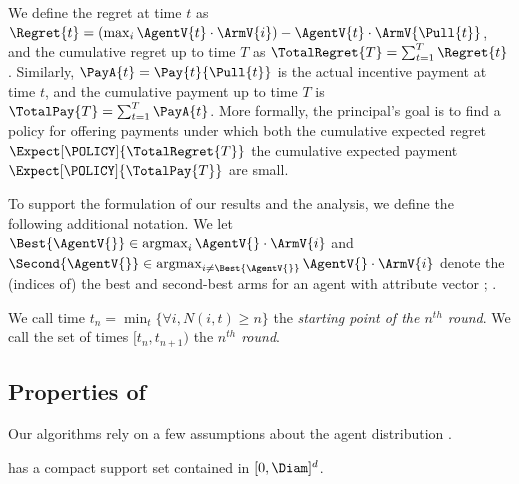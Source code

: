 We define the regret at time $t$ as
$\Regret{t} = (\max_{i} \AgentV{t} \cdot \ArmV{i}) - \AgentV{t} \cdot \ArmV{\Pull{t}}$,
and the cumulative regret up to time $T$ as
$\TotalRegret{T} = \sum_{t=1}^{T} \Regret{t}$.
Similarly, $\PayA{t} = \Pay{t}{\Pull{t}}$ is the actual incentive
payment at time $t$,
and the cumulative payment up to time $T$ is
$\TotalPay{T} = \sum_{t=1}^{T} \PayA{t}$.
More formally, the principal's goal is to find a policy
\POLICY for offering payments under which both the cumulative expected
regret
$\Expect[\POLICY]{\TotalRegret{T}}$ the cumulative expected payment
$\Expect[\POLICY]{\TotalPay{T}}$ are small.

To support the formulation of our results and the analysis,
we define the following additional notation.
We let
$\Best{\AgentV{}} \in \argmax_i \AgentV{} \cdot \ArmV{i}$
and
$ \Second{\AgentV{}} \in \argmax_{i \neq \Best{\AgentV{}}} \AgentV{} \cdot \ArmV{i}$
denote the (indices of) the best and second-best arms for an agent
with attribute vector \AgentV{};
.

We call time $t_{n}=\min_{t}\{\forall i, N(i,t)\geq n\}$ the
\emph{starting point of the $n^{th}$ round}.
We call the set of times $[t_{n}, t_{n+1})$ the
\emph{$n^{th}$ round}.




\subsection{Properties of \AgentDist}
Our algorithms rely on a few assumptions about the agent distribution
\AgentDist.

\begin{assumption} \label{A2}
\AgentDist has a compact support set contained in $[0,\Diam]^d$.
\end{assumption}


